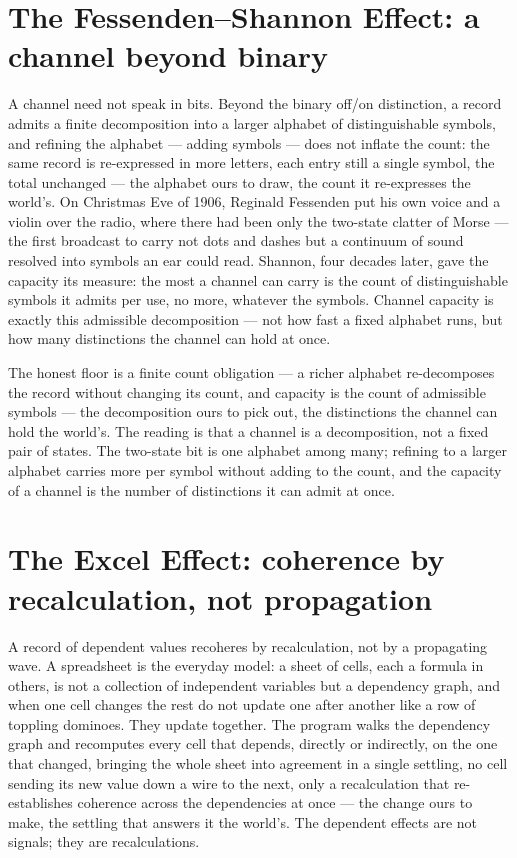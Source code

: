 \section{The Fessenden--Shannon Effect: a channel beyond binary}
\label{se:fessenden-shannon}

A channel need not speak in bits. Beyond the binary off/on distinction, a record admits a finite decomposition
into a larger alphabet of distinguishable symbols, and refining the alphabet --- adding symbols --- does not
inflate the count: the same record is re-expressed in more letters, each entry still a single symbol, the total
unchanged --- the alphabet ours to draw, the count it re-expresses the world's. On Christmas Eve of 1906, Reginald Fessenden put his own voice and a violin over the radio, where
there had been only the two-state clatter of Morse --- the first broadcast to carry not dots and dashes but a
continuum of sound resolved into symbols an ear could read. Shannon, four decades later, gave the capacity its
measure: the most a channel can carry is the count of distinguishable symbols it admits per use, no more,
whatever the symbols. Channel capacity is exactly this admissible decomposition --- not how fast a
fixed alphabet runs, but how many distinctions the channel can hold at once.

The honest floor is a finite count obligation --- a richer alphabet re-decomposes the record without changing
its count, and capacity is the count of admissible symbols --- the decomposition ours to pick out, the
distinctions the channel can hold the world's. The reading is that a channel is a decomposition,
not a fixed pair of states. The two-state bit is one alphabet among many; refining to a larger alphabet carries
more per symbol without adding to the count, and the capacity of a channel is the number of distinctions it can
admit at once.

\section{The Excel Effect: coherence by recalculation, not propagation}
\label{se:excel}

A record of dependent values recoheres by recalculation, not by a propagating wave. A spreadsheet is the
everyday model: a sheet of cells, each a formula in others, is not a collection of independent variables but a
dependency graph, and when one cell changes the rest do not update one after another like a row of toppling
dominoes. They update together. The program walks the dependency graph and recomputes every cell that depends,
directly or indirectly, on the one that changed, bringing the whole sheet into agreement in a single settling,
no cell sending its new value down a wire to the next, only a recalculation that re-establishes coherence
across the dependencies at once --- the change ours to make, the settling that answers it the world's. The
dependent effects are not signals; they are recalculations.


